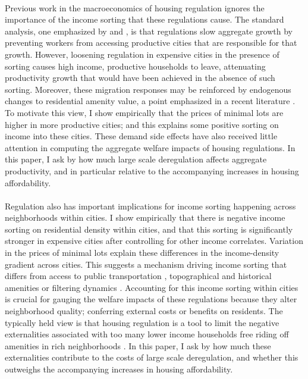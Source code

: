 \documentclass[12pt]{article}
\begin{document}
	\paragraph*{}
	Previous work in the macroeconomics of housing regulation ignores the importance of the income sorting that these regulations cause. The standard analysis, one emphasized by \cite{hseihmoretti} and \cite{durantonpugaurbgrowth}, is that regulations slow aggregate growth by preventing workers from accessing productive cities that are responsible for that growth. However, loosening regulation in expensive cities in the presence of sorting causes high income, productive households to leave, attenuating productivity growth that would have been achieved in the absence of such sorting. Moreover, these migration responses may be reinforced by endogenous changes to residential amenity value, a point emphasized in a recent literature \citep{diamond2016, AlmagroDI}. To motivate this view, I show empirically that the prices of minimal lots are higher in more productive cities; and this explains some positive sorting on income into these cities. These demand side effects have also received little attention in computing the aggregate welfare impacts of housing regulations. In this paper, I ask by how much large scale deregulation affects aggregate productivity, and in particular relative to the accompanying increases in housing affordability. 
	  
	
	\paragraph*{} 
	Regulation also has important implications for income sorting happening across neighborhoods within cities. I show empirically that there is negative income sorting on residential density within cities, and that this sorting is significantly stronger in expensive cities after controlling for other income correlates. Variation in the prices of minimal lots explain these differences in the income-density gradient across cities. This suggests a mechanism driving income sorting that differs from access to public transportation \citep{ccpoortransport}, topographical and historical amenities \citep{parispoor} or filtering dynamics \citep{Gentrificationcycles}. Accounting for this income sorting within cities is crucial for gauging the welfare impacts of these regulations because they alter neighborhood quality; conferring external costs or benefits on residents. The typically held view is that housing regulation is a tool to limit the negative externalities associated with too many lower income households free riding off amenities in rich neighborhoods \citep{calabresetal, Hamilton1975}. In this paper, I ask by how much these externalities contribute to the costs of large scale deregulation, and whether this outweighs the accompanying increases in housing affordability.  
		
\end{document}
